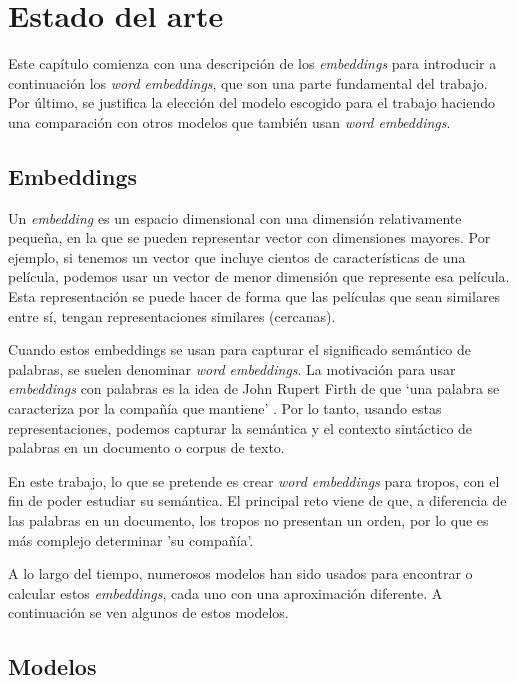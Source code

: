 \chapter{Estado del arte}

Este capítulo comienza con una descripción de los \textit{embeddings} para introducir a
continuación los \textit{word embeddings}, que son una parte fundamental del trabajo. Por
último, se justifica la elección del modelo escogido para el trabajo haciendo una comparación con
otros modelos que también usan \textit{word embeddings}.

\section{Embeddings}

Un \textit{embedding} es un espacio dimensional con una dimensión relativamente pequeña, en la que se pueden
representar vector con dimensiones mayores. Por ejemplo, si tenemos un vector que incluye cientos de características
de una película, podemos usar un vector de menor dimensión que represente esa película.  Esta representación se puede
hacer de forma que las películas que sean similares entre sí, tengan representaciones similares (cercanas).

Cuando estos embeddings se usan para capturar el significado semántico de palabras, se suelen denominar
\textit{word embeddings}. La motivación para usar \textit{embeddings} con palabras es la idea de John Rupert
Firth de que `una palabra se caracteriza por la compañía que mantiene' \cite{firth1957synopsis}. Por lo tanto,
usando estas representaciones, podemos capturar la semántica y el contexto sintáctico de palabras en un documento
o corpus de texto.

En este trabajo, lo que se pretende es crear \textit{word embeddings} para tropos, con el fin de poder estudiar
su semántica. El principal reto viene de que, a diferencia de las palabras en un documento, los tropos no presentan
un orden, por lo que es más complejo determinar 'su compañía'.

A lo largo del tiempo, numerosos modelos han sido usados para encontrar o calcular estos \textit{embeddings}, cada uno
con una aproximación diferente. A continuación se ven algunos de estos modelos.

\section{Modelos}


